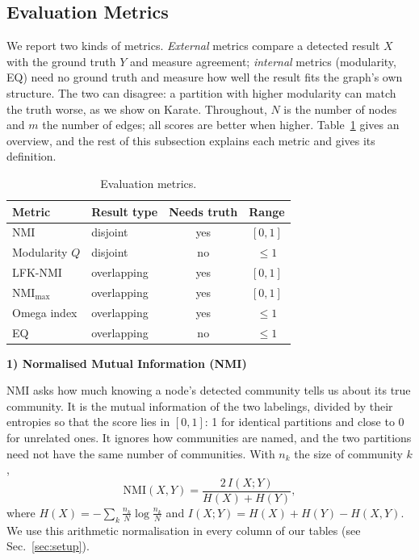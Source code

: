 \documentclass[conference]{IEEEtran}
\newcommand{\metrichead}[1]{\par\smallskip\noindent\textbf{#1}\par\nobreak\vspace{1pt}}
\begin{document}
\subsection{Evaluation Metrics}\label{sec:metrics}
We report two kinds of metrics. \emph{External} metrics compare a detected result $X$ with the ground truth $Y$ and measure agreement; \emph{internal} metrics (modularity, EQ) need no ground truth and measure how well the result fits the graph's own structure. The two can disagree: a partition with higher modularity can match the truth worse, as we show on Karate. Throughout, $N$ is the number of nodes and $m$ the number of edges; all scores are better when higher. Table~\ref{tab:metrics} gives an overview, and the rest of this subsection explains each metric and gives its definition.
\begin{table}[!htb]
\centering
\caption{Evaluation metrics.}
\label{tab:metrics}
\scriptsize
\setlength{\tabcolsep}{3pt}
\begin{tabular}{llcc}
\toprule
Metric & Result type & Needs truth & Range \\
\midrule
NMI & disjoint & yes & $[0,1]$ \\
Modularity $Q$ & disjoint & no & $\le 1$ \\
LFK-NMI & overlapping & yes & $[0,1]$ \\
$\mathrm{NMI}_{\max}$ & overlapping & yes & $[0,1]$ \\
Omega index & overlapping & yes & $\le 1$ \\
EQ & overlapping & no & $\le 1$ \\
\bottomrule
\end{tabular}
\end{table}

\metrichead{1) Normalised Mutual Information (NMI)}
NMI asks how much knowing a node's detected community tells us about its true community. It is the mutual information of the two labelings, divided by their entropies so that the score lies in $[0,1]$: 1 for identical partitions and close to 0 for unrelated ones. It ignores how communities are named, and the two partitions need not have the same number of communities. With $n_k$ the size of community $k$,
\begin{equation}
\mathrm{NMI}(X,Y)=\frac{2\,I(X;Y)}{H(X)+H(Y)},\label{eq:nmi}
\end{equation}
where $H(X)=-\sum_k\frac{n_k}{N}\log\frac{n_k}{N}$ and $I(X;Y)=H(X)+H(Y)-H(X,Y)$. We use this arithmetic normalisation in every column of our tables (see Sec.~\ref{sec:setup}).
\end{document}
